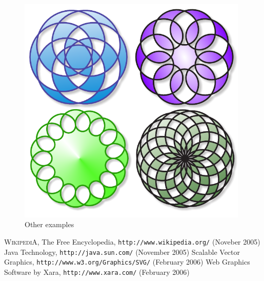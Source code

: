 \documentclass[12pt, a4paper]{article}
\newcommand{\url}[1]{\texttt{#1}}
\begin{document}
\begin{figure}[ht]\centering
  \includegraphics[width=11cm]{other}
  \caption{Other examples}
  \label{other}
\end{figure}


\clearpage
\begin{thebibliography}{99}
   \textsc{WikipediA}, The Free Encyclopedia, \url{http://www.wikipedia.org/} (Noveber 2005)
   Java Technology, \url{http://java.sun.com/} (November 2005)
   Scalable Vector Graphics, \url{http://www.w3.org/Graphics/SVG/} (February 2006)
   Web Graphics Software by Xara, \url{http://www.xara.com/} (February 2006)
\end{thebibliography} 
\end{document}
